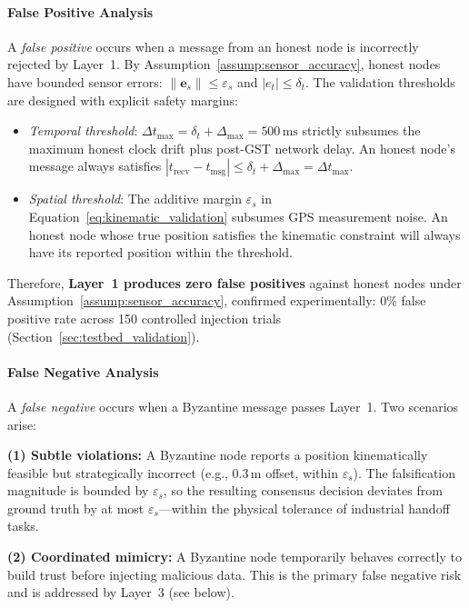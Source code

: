 \documentclass[manuscript,screen,review]{acmart}
\begin{document}
\paragraph{False Positive Analysis}

A \textit{false positive} occurs when a message from an honest node is incorrectly rejected by Layer~1. By Assumption~\ref{assump:sensor_accuracy}, honest nodes have bounded sensor errors: $\|\mathbf{e}_s\| \leq \varepsilon_s$ and $|e_t| \leq \delta_t$. The validation thresholds are designed with explicit safety margins:
\begin{itemize}
    \item \textit{Temporal threshold}: $\Delta t_{\max} = \delta_t + \Delta_{\max} = 500\,\text{ms}$ strictly subsumes the maximum honest clock drift plus post-GST network delay. An honest node's message always satisfies $|t_{\text{recv}} - t_{\text{msg}}| \leq \delta_t + \Delta_{\max} = \Delta t_{\max}$.
    \item \textit{Spatial threshold}: The additive margin $\varepsilon_s$ in Equation~\eqref{eq:kinematic_validation} subsumes GPS measurement noise. An honest node whose true position satisfies the kinematic constraint will always have its reported position within the threshold.
\end{itemize}
Therefore, \textbf{Layer~1 produces zero false positives} against honest nodes under Assumption~\ref{assump:sensor_accuracy}, confirmed experimentally: 0\% false positive rate across 150 controlled injection trials (Section~\ref{sec:testbed_validation}).

\paragraph{False Negative Analysis}

A \textit{false negative} occurs when a Byzantine message passes Layer~1. Two scenarios arise:

\textbf{(1) Subtle violations:} A Byzantine node reports a position kinematically feasible but strategically incorrect (e.g., $0.3\,\text{m}$ offset, within $\varepsilon_s$). The falsification magnitude is bounded by $\varepsilon_s$, so the resulting consensus decision deviates from ground truth by at most $\varepsilon_s$---within the physical tolerance of industrial handoff tasks.

\textbf{(2) Coordinated mimicry:} A Byzantine node temporarily behaves correctly to build trust before injecting malicious data. This is the primary false negative risk and is addressed by Layer~3 (see below).
\end{document}
